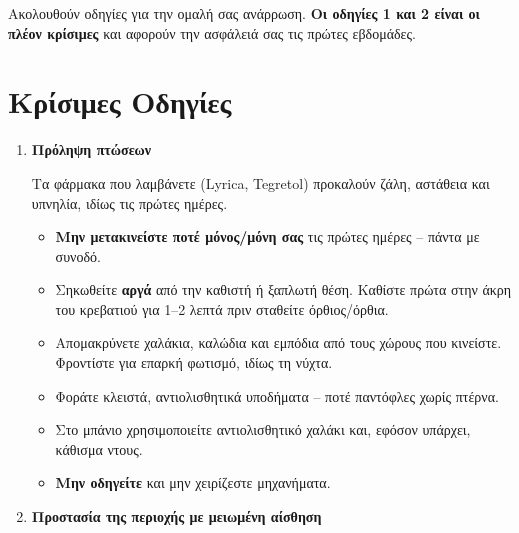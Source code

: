 \documentclass[10pt,greek]{article}
\begin{document}
\begin{PatientInfo}
\end{PatientInfo}

Ακολουθούν οδηγίες για την ομαλή σας ανάρρωση. \textbf{Οι οδηγίες 1 και 2 είναι οι πλέον κρίσιμες} και αφορούν την ασφάλειά σας τις πρώτες εβδομάδες.

\section*{Κρίσιμες Οδηγίες}
\begin{enumerate}[label=\arabic*.]
\setlength{\parskip}{6pt}
  \item \textbf{Πρόληψη πτώσεων}

Τα φάρμακα που λαμβάνετε (Lyrica, Tegretol) προκαλούν ζάλη, αστάθεια και υπνηλία, ιδίως τις πρώτες ημέρες.
       \begin{itemize}
\item \textbf{Μην μετακινείστε ποτέ μόνος/μόνη σας} τις πρώτες ημέρες -- πάντα με συνοδό.
\item Σηκωθείτε \textbf{αργά} από την καθιστή ή ξαπλωτή θέση. Καθίστε πρώτα στην άκρη του κρεβατιού για 1--2 λεπτά πριν σταθείτε όρθιος/όρθια.
\item Απομακρύνετε χαλάκια, καλώδια και εμπόδια από τους χώρους που κινείστε. Φροντίστε για επαρκή φωτισμό, ιδίως τη νύχτα.
\item Φοράτε κλειστά, αντιολισθητικά υποδήματα -- ποτέ παντόφλες χωρίς πτέρνα.
\item Στο μπάνιο χρησιμοποιείτε αντιολισθητικό χαλάκι και, εφόσον υπάρχει, κάθισμα ντους.
\item \textbf{Μην οδηγείτε} και μην χειρίζεστε μηχανήματα.
    \end{itemize}

  \item \textbf{Προστασία της περιοχής με μειωμένη αίσθηση}


\end{enumerate}
\end{document}
